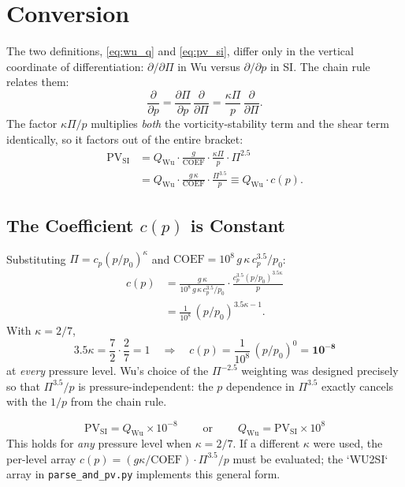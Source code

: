 \section{Conversion}

The two definitions, \eqref{eq:wu_q} and \eqref{eq:pv_si}, differ only
in the vertical coordinate of differentiation:
$\partial/\partial\Pi$ in Wu versus $\partial/\partial p$ in SI.  The
chain rule relates them:
\begin{equation}
\frac{\partial}{\partial p}
  = \frac{\partial\Pi}{\partial p}\,\frac{\partial}{\partial\Pi}
  = \frac{\kappa\Pi}{p}\,\frac{\partial}{\partial\Pi}.
\label{eq:chain}
\end{equation}
The factor $\kappa\Pi/p$ multiplies \emph{both} the vorticity-stability
term and the shear term identically, so it factors out of the entire
bracket:
\begin{align}
\mathrm{PV}_{\text{SI}}
  &= Q_{\text{Wu}}\cdot\frac{g}{\mathrm{COEF}}\cdot
     \frac{\kappa\Pi}{p}\cdot\Pi^{2.5} \nonumber \\
  &= Q_{\text{Wu}}\cdot\frac{g\,\kappa}{\mathrm{COEF}}\cdot
     \frac{\Pi^{3.5}}{p}
  \equiv Q_{\text{Wu}}\cdot c(p).
\label{eq:exact}
\end{align}

\subsection{The Coefficient $c(p)$ is Constant}

Substituting $\Pi = c_p(p/p_0)^{\kappa}$ and
$\mathrm{COEF} = 10^{8}\,g\,\kappa\,c_p^{3.5}/p_0$:
\begin{align}
c(p) &= \frac{g\,\kappa}{10^{8}\,g\,\kappa\,c_p^{3.5}/p_0}\cdot
       \frac{c_p^{3.5}(p/p_0)^{3.5\kappa}}{p} \nonumber \\
     &= \frac{1}{10^{8}}\,(p/p_0)^{3.5\kappa-1}.
\label{eq:c_p}
\end{align}
With $\kappa = 2/7$,
\begin{equation}
3.5\kappa = \frac{7}{2}\cdot\frac{2}{7} = 1
\quad\Longrightarrow\quad
c(p) = \frac{1}{10^{8}}\,(p/p_0)^{0} = \mathbf{10^{-8}}
\label{eq:constant}
\end{equation}
at \emph{every} pressure level.  Wu's choice of the $\Pi^{-2.5}$
weighting was designed precisely so that $\Pi^{3.5}/p$ is
pressure-independent: the $p$ dependence in $\Pi^{3.5}$ exactly
cancels with the $1/p$ from the chain rule.

\begin{keybox}
  \[
  \boxed{\;\mathrm{PV}_{\text{SI}} = Q_{\text{Wu}} \times 10^{-8}\;}
  \qquad\text{or}\qquad
  \boxed{\;Q_{\text{Wu}} = \mathrm{PV}_{\text{SI}} \times 10^{8}\;}
  \]
  This holds for \emph{any} pressure level when $\kappa = 2/7$.
  If a different $\kappa$ were used, the per-level array
  $c(p) = (g\kappa/\mathrm{COEF})\cdot\Pi^{3.5}/p$ must be
  evaluated; the `WU2SI` array in \texttt{parse\_and\_pv.py}
  implements this general form.
\end{keybox}

